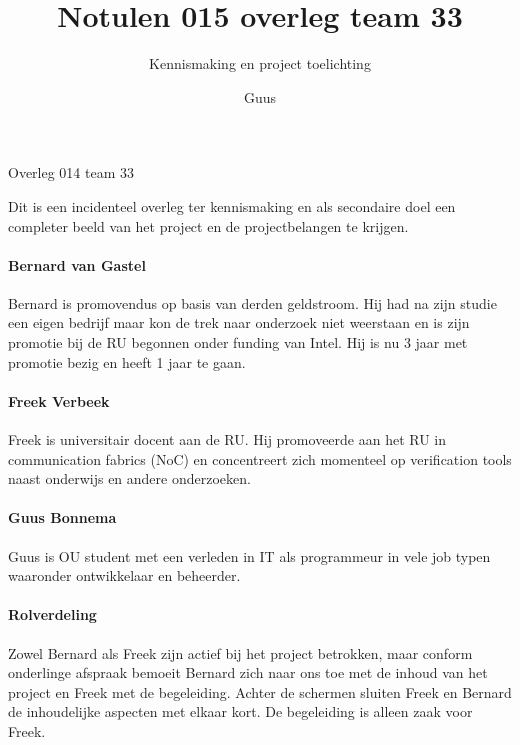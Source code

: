 \documentclass[a4paper,final]{article}
\title{Notulen 015 overleg team 33}
\author{Guus}
\begin{document}

\begin{Minutes}{Overleg 014 team 33}
\subtitle{Kennismaking en project toelichting}

\maketitle%

\newcommand{\w}[1]{\textsc{#1}}


Dit is een incidenteel overleg ter kennismaking en als secondaire doel een
completer beeld van het project en de projectbelangen te krijgen.

\paragraph{Bernard van Gastel} Bernard is promovendus op basis van derden geldstroom. 
Hij had na zijn studie een eigen bedrijf maar kon de trek naar onderzoek niet weerstaan
en is zijn promotie bij de RU begonnen onder funding van Intel. Hij is nu 3 jaar 
met promotie bezig en heeft 1 jaar te gaan.

\paragraph{Freek Verbeek} Freek is universitair docent aan de RU. 
Hij promoveerde aan het RU in communication fabrics (NoC) en concentreert zich
momenteel op verification tools naast onderwijs en andere onderzoeken.

\paragraph{Guus Bonnema} Guus is OU student met een verleden in IT 
als programmeur in vele job typen waaronder ontwikkelaar en beheerder.

\paragraph{Rolverdeling} Zowel Bernard als Freek zijn actief bij het project
betrokken, maar conform onderlinge afspraak bemoeit Bernard zich naar ons toe
met de inhoud van het project en Freek met de begeleiding. 
Achter de schermen sluiten Freek en Bernard de inhoudelijke aspecten met elkaar kort.
De begeleiding is alleen zaak voor Freek.


\end{Minutes}
\end{document}
